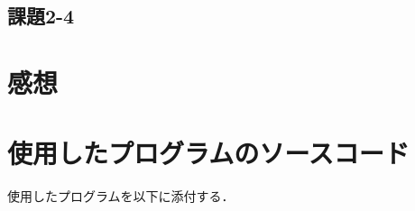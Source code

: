 \subsection{課題2-4}


\section{感想}


\section{使用したプログラムのソースコード} \label{sec:makep}

使用したプログラムを以下に添付する．


